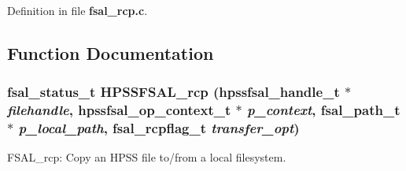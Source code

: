 Definition in file {\bf fsal\_\-rcp.c}.

\subsection{Function Documentation}
\subsubsection[{HPSSFSAL\_\-rcp}]{\setlength{\rightskip}{0pt plus 5cm}fsal\_\-status\_\-t HPSSFSAL\_\-rcp (hpssfsal\_\-handle\_\-t $\ast$ {\em filehandle}, \/  hpssfsal\_\-op\_\-context\_\-t $\ast$ {\em p\_\-context}, \/  fsal\_\-path\_\-t $\ast$ {\em p\_\-local\_\-path}, \/  fsal\_\-rcpflag\_\-t {\em transfer\_\-opt})}\label{fsal__rcp_8c_a35c444900ecb812ceaa216ad92ec175d}
FSAL\_\-rcp: Copy an HPSS file to/from a local filesystem.


